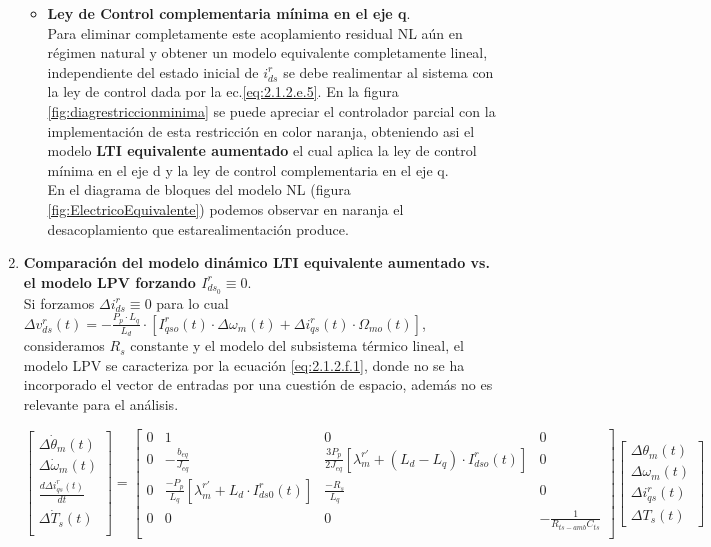 \documentclass[10pt]{article}
\begin{document}
\begin{enumerate}
\begin{itemize}
	   \item\textbf{Ley de Control complementaria mínima en el eje q}.\\
	    Para eliminar completamente este acoplamiento residual NL aún en régimen natural y obtener un modelo equivalente 				completamente lineal, independiente del estado inicial de $i^{r}_{ds}$ se debe realimentar al sistema con la ley de control 			dada por la ec.\ref{eq:2.1.2.e.5}. En la figura \ref{fig:diagrestriccionminima} se puede apreciar el controlador parcial con la implementación de esta restricción en color naranja, obteniendo asi el modelo \textbf{LTI equivalente aumentado} el cual aplica la ley de control mínima en el eje d y la ley de control complementaria en el eje q.\\
	     En el diagrama de bloques del modelo NL (figura \ref{fig:ElectricoEquivalente})  podemos observar en naranja el desacoplamiento que estarealimentación produce.\\
	\end{itemize}
	
	 \item \textbf{Comparación del modelo dinámico LTI equivalente aumentado vs. el modelo LPV forzando $I^{r}_{ds_{0}} \equiv 0$}.\\
	 Si forzamos $\Delta i^{r}_{ds} \equiv 0$ para lo cual  $\Delta v^{r}_{ds}(t)=-\frac{P_{p}\cdot L_{q}}{L_{d}}\cdot\left [  I_{qso}^{r}(t)\cdot \Delta\omega_{m}(t)+\Delta i_{qs}^{r}(t)\cdot \Omega_{mo}(t) \right ]$, consideramos $R_{s}$ constante y el modelo del subsistema térmico lineal, el modelo LPV se caracteriza por la ecuación \ref{eq:2.1.2.f.1}, donde no se ha incorporado el vector de entradas por una cuestión de espacio, además no es relevante para el análisis.
	 
	 \begin{equation}
		\begin{bmatrix}
	\Delta \dot{\theta}_{m}(t)\\
	\Delta \dot{\omega}_{m}(t)
	\\ 
	\frac{d \Delta i^{r}_{qs}(t)}{dt}\\
	\Delta \dot{T}_{s}(t)\\
	\end{bmatrix}
	=
	\begin{bmatrix}
		0 & 1 &0 &0  \\ 
		0 & -\frac{b_{eq}}{J_{eq}} & \frac{3 P_{p}}{2 J_{eq}}[ \lambda^{r'}_{m}+\left ( L_{d}-L_{q} \right )\cdot I_{dso}^{r} (t)]&0 \\ 
		0  & \frac{- P_{p} }{ L_{q}} [\lambda^{r'}_{m}+L_{d}\cdot I^{r}_{ds0}(t)]& \frac{-R_{s}}{L_{q}}&0\\
		0 & 0 & 0 & -\frac{1}{R_{ts-amb} C_{ts}}\\
		\end{bmatrix} 
	\begin{bmatrix}
	\Delta \theta_{m}(t)\\
	\Delta \omega_{m}(t)
	\\ 
	\Delta i^{r}_{qs}(t)\\
	\Delta T_{s}(t)
	\end{bmatrix}
	\label{eq:2.1.2.f.1}
	\end{equation}
	

\end{enumerate}
\end{document}
